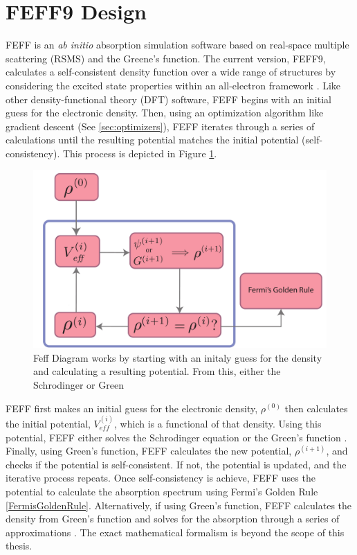 \section{FEFF9 Design}

FEFF is an \textit{ab initio} absorption simulation software based on real-space multiple scattering (RSMS) and the Greene's function. The current version, FEFF9, calculates a self-consistent density function over a wide range of structures by considering the excited state properties within an all-electron framework \cite{feff-new-dev}. Like other density-functional theory (DFT) software, FEFF begins with an initial guess for the electronic density. Then, using an optimization algorithm like gradient descent (See \ref{sec:optimizers}), FEFF iterates through a series of calculations until the resulting potential matches the initial potential (self-consistency). This process is depicted in Figure \ref{fig:feff-dft-diagram}.

\begin{figure}
    \centering
    \includegraphics[width=\linewidth]{Chapters/Figures/dft-feff-diagram.pdf}
    \caption[FEFF Diagram]{Feff Diagram works by starting with an initaly guess for the density and calculating a resulting potential. From this, either the Schrodinger or Green}
    \label{fig:feff-dft-diagram}
\end{figure}

FEFF first makes an initial guess for the electronic density, $ \rho^{(0)} $  then calculates the initial potential, $ V_{eff}^{(i)} $, which is a functional of that density. Using this potential, FEFF either solves the Schrodinger equation or the Green's function \cite{greens-function-xafs-2021}. Finally, using Green's function, FEFF calculates the new potential, $ \rho^{(i+1)} $, and checks if the potential is self-consistent. If not, the potential is updated, and the iterative process repeats. Once self-consistency is achieve, FEFF uses the potential to calculate the absorption spectrum using Fermi's Golden Rule \ref{FermisGoldenRule}. Alternatively, if using Green's function, FEFF calculates the density from Green's function and solves for the absorption through a series of approximations \cite{feff-citation} \cite{rehr2010parameter}. The exact mathematical formalism is beyond the scope of this thesis.

